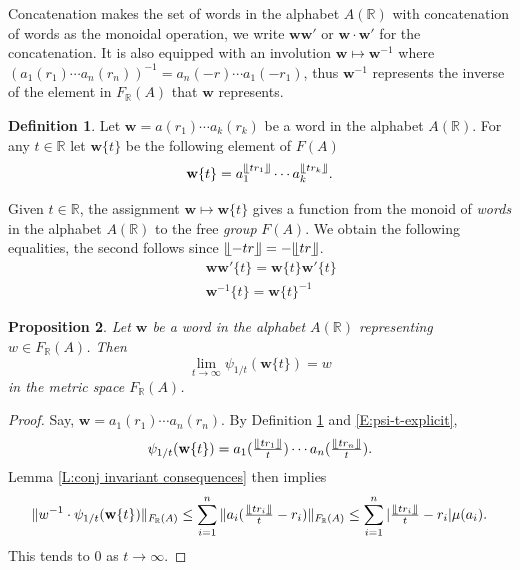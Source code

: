\documentclass[12pt]{amsart}
\newtheorem{prop}{Proposition}[section]
\theoremstyle{definition}
\newtheorem{defn}[prop]{Definition}
\def\RR{\ensuremath{\mathbb{R}}}
\newcommand{\B}[1]{\mathbf{#1}}
\newcommand{\trc}[1]{\{ #1 \}}   %
\def\Free{F}
\newcommand{\myfloor}[1]{\llfloor #1 \rrfloor}
\begin{document}
Concatenation makes the set of words in the alphabet $A(\RR)$ with concatenation of words as the monoidal operation, we write $\B w \B w'$ or $\B w \cdot \B w'$ for the concatenation.
It is also equipped with an involution $\B w \mapsto \B w^{-1}$ where $(a_1(r_1) \cdots a_n(r_n))^{-1}=a_n(-r) \cdots a_1(-r_1)$, thus $\B w^{-1}$ represents the inverse of the element in $\Free_\RR(A)$ that $\B w$ represents.

\begin{defn}\label{D:truncation FRQ --> FA}
Let $\B w = a(r_1) \cdots a_k(r_k)$ be a word in the alphabet $A(\RR)$.
For any $t \in \RR$ let $\B w\trc{t}$ be the following element of $\Free(A)$
\[
\B w\trc{t} = a_1^{\myfloor{t r_1}} \cdots a_k^{\myfloor{t r_k}}.
\]
\end{defn}


Given $t \in \RR$, the assignment $\B w \mapsto \B w\trc{t}$ gives a function from the monoid of {\em words} in the alphabet $A(\RR)$ to the free {\em group} $\Free(A)$.
We obtain the following equalities, the second follows since $\myfloor{-tr}=-\myfloor{tr}$.
\begin{eqnarray}\label{E:truncation properties}
&& \B w\B w'\trc{t} = \B w \trc{t} \B w'\trc{t} \\
\nonumber
&& \B w^{-1} \trc{t} = \B w\trc{t}^{-1}
\end{eqnarray}




\begin{prop}\label{P:psi_1/t(w[t])-->w}
Let $\B w$ be a word in the alphabet $A(\RR)$ representing $w \in \Free_\RR(A)$.
Then
\[
\lim_{t \to \infty} \psi_{1/t}(\B w\trc{t}) = w
\]
in the metric space $\Free_\RR(A)$.
\end{prop}

\begin{proof}
Say, $\B w=a_1(r_1) \cdots a_n(r_n)$.
By Definition \ref{D:truncation FRQ --> FA} and \eqref{E:psi-t-explicit}, 
\[
\psi_{1/t}(\B w\trc{t})=a_1(\tfrac{\myfloor{tr_1}}{t}) \cdots a_n(\tfrac{\myfloor{tr_n}}{t}).
\]
Lemma \ref{L:conj invariant consequences} then implies
\[
\| w^{-1} \cdot \psi_{1/t}(\B w\trc{t})\|_{\Free_\RR(A)} \leq
\sum_{i=1}^n  \| a_i(\tfrac{\myfloor{tr_i}}{t}-r_i)\|_{\Free_\RR(A)} \leq
\sum_{i=1}^n |\tfrac{\myfloor{tr_i}}{t}-r_i| \mu(a_i).
\]
This tends to $0$ as $t \to \infty$.
\end{proof}
\end{document}
